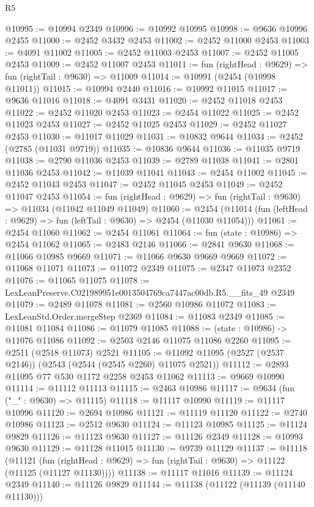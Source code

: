 \begin{lexlean}{R5}
\begin{coremodule}
@10995 := @10994 @2349
@10996 := @10992 @10995
@10998 := @9636 @10996 @2455
@11000 := @2452 @3432 @2453
@11002 := @2452 @11000 @2453
@11003 := @4091 @11002
@11005 := @2452 @11003 @2453
@11007 := @2452 @11005 @2453
@11009 := @2452 @11007 @2453
@11011 := fun (rightHead : @9629) => fun (rightTail : @9630) => @11009
@11014 := @10991 (@2454 (@10998 @11011))
@11015 := @10994 @2440
@11016 := @10992 @11015
@11017 := @9636 @11016
@11018 := @4091 @3431
@11020 := @2452 @11018 @2453
@11022 := @2452 @11020 @2453
@11023 := @2454 @11022
@11025 := @2452 @11023 @2453
@11027 := @2452 @11025 @2453
@11029 := @2452 @11027 @2453
@11030 := @11017 @11029
@11031 := @10832 @9644
@11034 := @2452 (@2785 (@11031 @9719))
@11035 := @10836 @9644
@11036 := @11035 @9719
@11038 := @2790 @11036 @2453
@11039 := @2789 @11038
@11041 := @2801 @11036 @2453
@11042 := @11039 @11041
@11043 := @2454 @11002
@11045 := @2452 @11043 @2453
@11047 := @2452 @11045 @2453
@11049 := @2452 @11047 @2453
@11054 := fun (rightHead : @9629) => fun (rightTail : @9630) => @11034 (@11042 @11049 @11049)
@11060 := @2454 (@11014 (fun (leftHead : @9629) => fun (leftTail : @9630) => @2454 (@11030 @11054)))
@11061 := @2454 @11060
@11062 := @2454 @11061
@11064 := fun (state : @10986) => @2454 @11062
@11065 := @2483 @2146
@11066 := @2841 @9630
@11068 := @11066 @10985 @9669
@11071 := @11066 @9630 @9669 @9669
@11072 := @11068 @11071
@11073 := @11072 @2349
@11075 := @2347 @11073 @2352
@11076 := @11065 @11075
@11078 := LexLeanPreserve.C021989951e0013504769ca7447ac00db.R5.__fits_49 @2349
@11079 := @2489 @11078
@11081 := @2560 @10986 @11072
@11083 := LexLeanStd.Order.mergeStep @2369
@11084 := @11083 @2349
@11085 := @11081 @11084
@11086 := @11079 @11085
@11088 := (state : @10986) -> @11076 @11086
@11092 := @2503 @2146 @11075 @11086 @2260
@11095 := @2511 (@2518 @11073) @2521
@11105 := @11092 @11095 (@2527 (@2537 @2146)) (@2543 (@2544 (@2545 @2260) @11075 @2521))
@11112 := @2893 @11095 @77 @530 @1172 @2258 @2453 @11062
@11113 := @9669 @10990
@11114 := @11112 @11113
@11115 := @2463 @10986
@11117 := @9634 (fun ("_" : @9630) => @11115)
@11118 := @11117 @10990
@11119 := @11117 @10996
@11120 := @2694 @10986
@11121 := @11119 @11120
@11122 := @2740 @10986
@11123 := @2512 @9630
@11124 := @11123 @10985
@11125 := @11124 @9829
@11126 := @11123 @9630
@11127 := @11126 @2349
@11128 := @10993 @9630
@11129 := @11128 @11015
@11130 := @9739 @11129
@11137 := @11118
    (@11121 (fun (rightHead : @9629) => fun (rightTail : @9630) => @11122 (@11125 (@11127 @11130))))
@11138 := @11117 @11016
@11139 := @11124 @2349
@11140 := @11126 @9829
@11144 := @11138 (@11122 (@11139 (@11140 @11130)))

\end{coremodule}
\end{lexlean}
